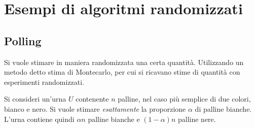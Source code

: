 \section{Esempi di algoritmi randomizzati}

\subsection{Polling}

Si vuole stimare in maniera randomizzata una certa quantità.
Utilizzando un metodo detto stima di Montecarlo, per cui si ricavano stime di quantità con esperimenti randomizzati.

Si consideri un'urna $U$ contenente $n$ palline, nel caso più semplice di due colori, bianco e nero.
Si vuole stimare 
\emph{esattamente} 
la proporzione $\alpha$ di palline bianche.
L'urna contiene quindi $
\alpha n
$ palline bianche e $
(1-\alpha) n
$ palline nere.

